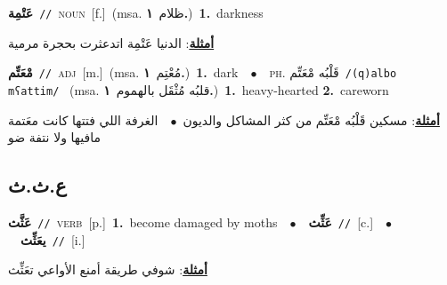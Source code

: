 \documentclass[10pt,a4paper,twoside]{article} %
\begin{document}
\begin{multicols}{2}
{\setlength\topsep{0pt}\textbf{\foreignlanguage{arabic}{عَتْمِة}}\ {\color{gray}\texttt{//}\color{black}}\ \textsc{noun}\ [f.]\ \color{gray}(msa. \foreignlanguage{arabic}{ظلام}~\foreignlanguage{arabic}{\textbf{١.}})\color{black}\ \textbf{1.}~darkness\  \begin{flushright}\color{gray}\foreignlanguage{arabic}{\textbf{\underline{\foreignlanguage{arabic}{أمثلة}}}: الدنيا عَتْمِة اتدعثرت بحجرة مرمية}\end{flushright}\color{black}} \vspace{2mm}

{\setlength\topsep{0pt}\textbf{\foreignlanguage{arabic}{مْعَتِّم}}\ {\color{gray}\texttt{//}\color{black}}\ \textsc{adj}\ [m.]\ \color{gray}(msa. \foreignlanguage{arabic}{مُعْتِم}~\foreignlanguage{arabic}{\textbf{١.}})\color{black}\ \textbf{1.}~dark\ \ $\bullet$\ \ \textsc{ph.} \color{gray} \foreignlanguage{arabic}{قَلْبُه مْعَتِّم}\color{black}\ {\color{gray}\texttt{/{\sffamily (q)albo mʕattim}/}\color{black}}\ \color{gray} (msa. \foreignlanguage{arabic}{قلبُه مُثْقَل بالهموم}~\foreignlanguage{arabic}{\textbf{١.}})\color{black}\ \textbf{1.}~heavy-hearted  \textbf{2.}~careworn\  \begin{flushright}\color{gray}\foreignlanguage{arabic}{\textbf{\underline{\foreignlanguage{arabic}{أمثلة}}}: مسكين قَلْبُه مْعَتِّم من كثر المشاكل والديون\ $\bullet$\ \  الغرفة اللي فتتها كانت معَتمة مافيها ولا نتفة ضو}\end{flushright}\color{black}} \vspace{2mm}

\vspace{-3mm}
\subsection*{\color{blue}\foreignlanguage{arabic}{ع.ث.ث}\color{blue}{}} 

{\setlength\topsep{0pt}\textbf{\foreignlanguage{arabic}{عَثَّث}}\ {\color{gray}\texttt{//}\color{black}}\ \textsc{verb}\ [p.]\ \textbf{1.}~become damaged by moths\ \ $\bullet$\ \ \setlength\topsep{0pt}\textbf{\foreignlanguage{arabic}{عَثِّث}}\ {\color{gray}\texttt{//}\color{black}}\ [c.]\ \ $\bullet$\ \ \setlength\topsep{0pt}\textbf{\foreignlanguage{arabic}{يعَثِّث}}\ {\color{gray}\texttt{//}\color{black}}\ [i.]\  \begin{flushright}\color{gray}\foreignlanguage{arabic}{\textbf{\underline{\foreignlanguage{arabic}{أمثلة}}}: شوفي طريقة أمنع الأواعي تعَثِّث}\end{flushright}\color{black}} \vspace{2mm}


\end{multicols}
\end{document}
